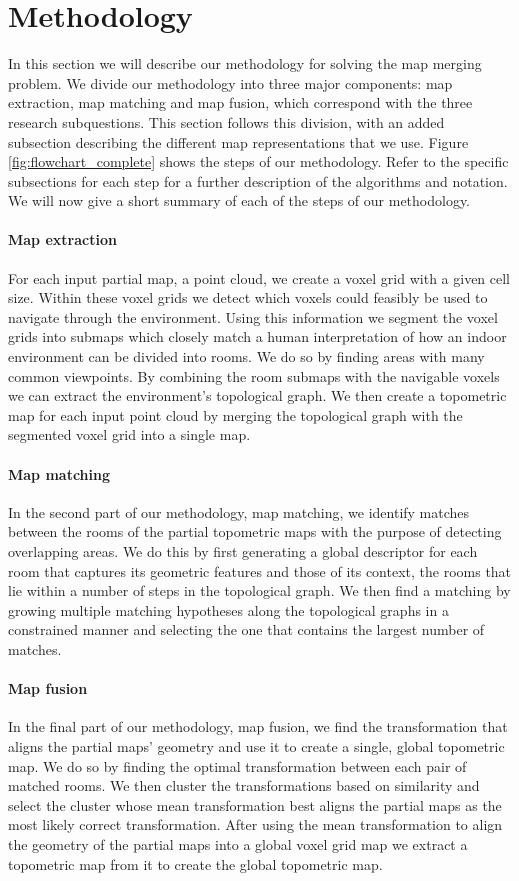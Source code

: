 \section{Methodology}
In this section we will describe our methodology for solving the map merging problem. We divide our methodology into three major components: map extraction, map matching and map fusion, which correspond with the three research subquestions. This section follows this division, with an added subsection describing the different map representations that we use. Figure \ref{fig:flowchart_complete} shows the steps of our methodology. Refer to the specific subsections for each step for a further description of the algorithms and notation. We will now give a short summary of each of the steps of our methodology.

\paragraph{Map extraction}
For each input partial map, a point cloud, we create a voxel grid with a given cell size. Within these voxel grids we detect which voxels could feasibly be used to navigate through the environment. Using this information we segment the voxel grids into submaps which closely match a human interpretation of how an indoor environment can be divided into rooms. We do so by finding areas with many common viewpoints. By combining the room submaps with the navigable voxels we can extract the environment's topological graph. We then create a topometric map for each input point cloud by merging the topological graph with the segmented voxel grid into a single map.

\paragraph{Map matching}
In the second part of our methodology, map matching, we identify matches between the rooms of the partial topometric maps with the purpose of detecting overlapping areas. We do this by first generating a global descriptor for each room that captures its geometric features and those of its context, the rooms that lie within a number of steps in the topological graph. We then find a matching by growing multiple matching hypotheses along the topological graphs in a constrained manner and selecting the one that contains the largest number of matches.

\paragraph{Map fusion}
In the final part of our methodology, map fusion, we find the transformation that aligns the partial maps' geometry and use it to create a single, global topometric map. We do so by finding the optimal transformation between each pair of matched rooms. We then cluster the transformations based on similarity and select the cluster whose mean transformation best aligns the partial maps as the most likely correct transformation. After using the mean transformation to align the geometry of the partial maps into a global voxel grid map we extract a topometric map from it to create the global topometric map.

